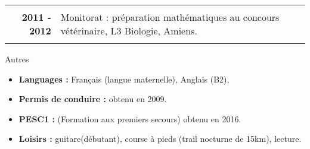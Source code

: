 \documentclass[10pt,a4paper]{report}
\def\sp{\vspace{6mm}}
\begin{document}
\begin{center}
\begin{tabular}{r p{12cm}}
& \\

\textbf{2011 - 2012} & Monitorat : préparation mathématiques au concours vétérinaire, L3 Biologie, Amiens.\\

& \\
\end{tabular}
\end{center}

























\sp
{\selectfont
\begin{Large}
Autres
\end{Large}
\hrulefill
}
\sp

\noindent
\begin{itemize}
\item \textbf{Languages :} Français (langue maternelle), Anglais (B2),
\item \textbf{Permis de conduire :} obtenu en 2009.
\item \textbf{PESC1 :} (Formation aux premiers secours) obtenu en 2016.
\item \textbf{Loisirs :} guitare(débutant), course à pieds (trail nocturne de 15km), lecture.
\end{itemize}
\end{document}
